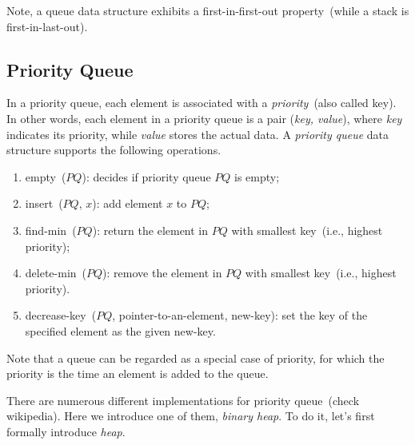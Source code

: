 \begin{minipage}{0.8\textwidth}
	\xxx
	\xxx
	\xxx
\end{minipage}

\begin{minipage}{0.8\textwidth}
	\xxx
	\xxx
	\xxx
\end{minipage}

Note, a queue data structure exhibits a first-in-first-out property~(while a stack is first-in-last-out).

\subsection*{Priority Queue}

In a priority queue, each element is associated with a \emph{priority}~(also called key).
In other words, each element in a priority queue is a pair (\emph{key, value}),
where \emph{key} indicates its priority, while \emph{value} stores the actual data.
A \emph{priority queue} data structure supports the following operations.
\vspace*{-\topsep}
\begin{enumerate}
\item empty~($PQ$): decides if priority queue $PQ$ is empty;
\item insert~($PQ$, $x$): add element $x$ to $PQ$;
\item find-min~($PQ$): return the element in $PQ$ with smallest key~(i.e., highest priority);
\item delete-min~($PQ$): remove the element in $PQ$ with smallest key~(i.e., highest priority).
\item decrease-key~($PQ$, pointer-to-an-element, new-key): set the key of the specified element as the given new-key.
\end{enumerate}

Note that a queue can be regarded as a special case of priority, for which the priority
is the time an element is added to the queue.

There are numerous different implementations for priority queue~(check wikipedia). 
Here we introduce one of them, \emph{binary heap}. To do it, let's first
formally introduce \emph{heap}.


